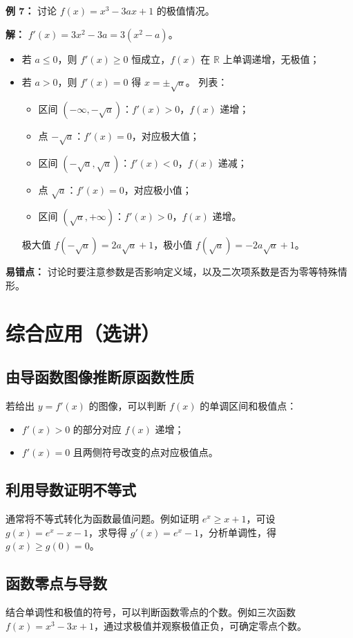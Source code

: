 \documentclass[10pt]{article}
\begin{document}
\textbf{例 7：} 讨论 $f(x)=x^3 - 3ax + 1$ 的极值情况。

\textbf{解：} $f'(x)=3x^2 - 3a = 3(x^2 - a)$。
\begin{itemize}
    \item 若 $a \le 0$，则 $f'(x) \ge 0$ 恒成立，$f(x)$ 在 $\mathbb{R}$ 上单调递增，无极值；
    \item 若 $a > 0$，则 $f'(x)=0$ 得 $x = \pm\sqrt{a}$。
    列表：
    \begin{itemize}
        \item 区间 $(-\infty,-\sqrt{a})$：$f'(x)>0$，$f(x)$ 递增；
        \item 点 $-\sqrt{a}$：$f'(x)=0$，对应极大值；
        \item 区间 $(-\sqrt{a},\sqrt{a})$：$f'(x)<0$，$f(x)$ 递减；
        \item 点 $\sqrt{a}$：$f'(x)=0$，对应极小值；
        \item 区间 $(\sqrt{a},+\infty)$：$f'(x)>0$，$f(x)$ 递增。
    \end{itemize}
    极大值 $f(-\sqrt{a})=2a\sqrt{a}+1$，极小值 $f(\sqrt{a})=-2a\sqrt{a}+1$。
\end{itemize}

\textbf{易错点：} 讨论时要注意参数是否影响定义域，以及二次项系数是否为零等特殊情形。

\section{综合应用（选讲）}
\subsection{由导函数图像推断原函数性质}
若给出 $y=f'(x)$ 的图像，可以判断 $f(x)$ 的单调区间和极值点：
\begin{itemize}
    \item $f'(x) > 0$ 的部分对应 $f(x)$ 递增；
    \item $f'(x) = 0$ 且两侧符号改变的点对应极值点。
\end{itemize}

\subsection{利用导数证明不等式}
通常将不等式转化为函数最值问题。例如证明 $e^x \ge x+1$，可设 $g(x)=e^x - x -1$，求导得 $g'(x)=e^x-1$，分析单调性，得 $g(x) \ge g(0)=0$。

\subsection{函数零点与导数}
结合单调性和极值的符号，可以判断函数零点的个数。例如三次函数 $f(x)=x^3-3x+1$，通过求极值并观察极值正负，可确定零点个数。
\end{document}
